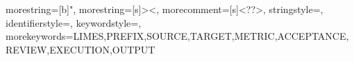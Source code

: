 \usepackage{color}


{
  morestring=[b]",
  morestring=[s]{>}{<},
  morecomment=[s]{<?}{?>},
  stringstyle=\color{black},
  identifierstyle=\color{darkblue},
  keywordstyle=\color{cyan},
  morekeywords={LIMES,PREFIX,SOURCE,TARGET,METRIC,ACCEPTANCE,REVIEW,EXECUTION,OUTPUT}%
}

\newenvironment{ttbox}{
 \begin{center}\vspace{-.5ex}
     \begin{tabular}{@{}|@{\,}c@{\,}|@{}}
\hline\\[-2ex]
\begin{minipage}[b]{.98\linewidth}
\begin{alltt}\ttbraces\small} 
                     {\end{alltt}
     \end {minipage}\\[.3ex]
  \hline
\end{tabular}
\end{center}}

\newcommand{\symb}[1]{\makebox{\it #1}}

\def \proactive {ProActive} 
\newcommand{\aspfun}{ASP${}_\text{fun}$\xspace}
\newcommand{\ttt}[1] {\texttt{#1}} 


